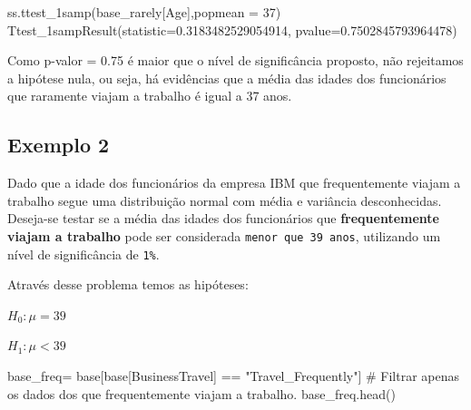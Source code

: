 \documentclass[
  letterpaper,
  DIV=11,
  numbers=noendperiod]{scrreprt}
\newenvironment{Shaded}{\begin{snugshade}}{\end{snugshade}}
\newcommand{\CommentTok}[1]{\textcolor[rgb]{0.37,0.37,0.37}{#1}}
\newcommand{\DecValTok}[1]{\textcolor[rgb]{0.68,0.00,0.00}{#1}}
\newcommand{\FloatTok}[1]{\textcolor[rgb]{0.68,0.00,0.00}{#1}}
\newcommand{\NormalTok}[1]{\textcolor[rgb]{0.00,0.23,0.31}{#1}}
\newcommand{\OperatorTok}[1]{\textcolor[rgb]{0.37,0.37,0.37}{#1}}
\newcommand{\StringTok}[1]{\textcolor[rgb]{0.13,0.47,0.30}{#1}}
\begin{document}
\begin{Shaded}
\begin{Highlighting}[]
\NormalTok{ss.ttest\_1samp(base\_rarely[}\StringTok{\textquotesingle{}Age\textquotesingle{}}\NormalTok{],popmean }\OperatorTok{=} \DecValTok{37}\NormalTok{)}
\NormalTok{Ttest\_1sampResult(statistic}\OperatorTok{=}\FloatTok{0.3183482529054914}\NormalTok{, pvalue}\OperatorTok{=}\FloatTok{0.7502845793964478}\NormalTok{)}
\end{Highlighting}
\end{Shaded}

Como p-valor = 0.75 é maior que o nível de significância proposto, não
rejeitamos a hipótese nula, ou seja, há evidências que a média das
idades dos funcionários que raramente viajam a trabalho é igual a 37
anos.

\hypertarget{exemplo-2}{%
\subsection{Exemplo 2}\label{exemplo-2}}

Dado que a idade dos funcionários da empresa IBM que frequentemente
viajam a trabalho segue uma distribuição normal com média e variância
desconhecidas. Deseja-se testar se a média das idades dos funcionários
que \textbf{frequentemente viajam a trabalho} pode ser considerada
\texttt{menor\ que\ 39\ anos}, utilizando um nível de significância de
\texttt{1\%}.

Através desse problema temos as hipóteses:

\(H_{0} : \mu = 39\)

\(H_{1} : \mu < 39\)

\begin{Shaded}
\begin{Highlighting}[]
\NormalTok{base\_freq}\OperatorTok{=}\NormalTok{ base[base[}\StringTok{\textquotesingle{}BusinessTravel\textquotesingle{}}\NormalTok{] }\OperatorTok{==} \StringTok{"Travel\_Frequently"}\NormalTok{] }\CommentTok{\# Filtrar apenas os dados dos que frequentemente viajam a trabalho.}
\NormalTok{base\_freq.head()}
\end{Highlighting}
\end{Shaded}
\end{document}
